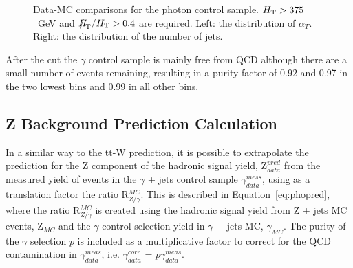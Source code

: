\begin{figure}[h]
\begin{center}
\caption{\label{fig:photon_plots} Data-MC comparisons for the photon control sample. $\mbox{$H_\text{T}$} > 375$~GeV and $\mht/\scalht>0.4$ are required. Left: the distribution of $\alpha_{T}$. Right: the distribution of the number of jets.}
\end{center}
\end{figure}

After the \alt cut the $\gamma$ control sample is mainly free from QCD although there are a small number of events remaining, resulting in a purity factor of 0.92 and 0.97 in the two lowest bins and 0.99 in all other bins.

\subsection{Z Background Prediction Calculation}

In a similar way to the t$\bar{\textrm{t}}$-W prediction, it is possible to extrapolate the prediction for the Z component of the hadronic signal yield, Z$^{pred}_{data}$ from the measured yield of events in the $\gamma$ + jets control sample $\gamma^{mess}_{data}$, using as a translation factor the ratio R$^{MC}_{Z/\gamma}$. This is described in Equation~\ref{eq:phopred}, where the ratio R$^{MC}_{Z/\gamma}$ is created using the hadronic signal yield from Z + jets MC events, Z$_{MC}$ and the $\gamma$ control selection yield in $\gamma$ + jets MC, $\gamma_{MC}$. The purity of the $\gamma$ selection $p$ is included as a multiplicative factor to correct for the QCD contamination in $\gamma^{meas}_{data}$, i.e. $\gamma^{corr}_{data}$ = $p \gamma^{meas}_{data}$.

